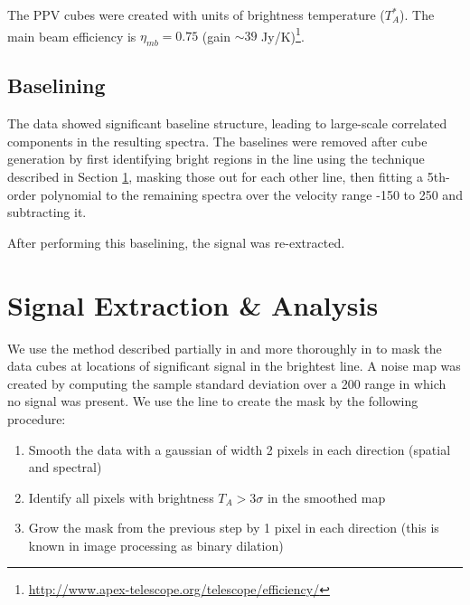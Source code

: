 
The PPV cubes were created with units of brightness temperature ($T_A^*$).  The
main beam efficiency is $\eta_{mb} = 0.75$ (gain $\sim39$
Jy/K)\footnote{\url{http://www.apex-telescope.org/telescope/efficiency/}}.



\subsection{Baselining}
\label{sec:baseline}
The data showed significant baseline structure, leading to large-scale
correlated components in the resulting spectra.  The baselines were removed
after cube generation by first identifying bright regions in the \para
\threeohthree line using the technique described in Section \ref{sec:signal},
masking those out for each other line, then fitting a 5th-order polynomial to
the remaining spectra over the velocity range -150 to 250 \kms and subtracting
it.

After performing this baselining, the signal was re-extracted.

\section{Signal Extraction \& Analysis}
\label{sec:signal}
We use the method described partially in \citet{Ao2013a} and more thoroughly in
\citet{Dame2011b} to mask the data cubes at locations of significant signal in 
the brightest line. 
A noise map was created by computing the sample standard deviation over a
200 \kms range in which no signal was present.
We use the \formaldehyde \threeohthree line to create the mask by
the following procedure:

\begin{enumerate}
    \item Smooth the data with a gaussian of width 2 pixels in each direction
        (spatial and spectral)
    \item Identify all pixels with brightness $T_A > 3\sigma$ in the smoothed
        map
    \item Grow the mask from the previous step by 1 pixel in each direction
        (this is known in image processing as binary dilation)
\end{enumerate}

